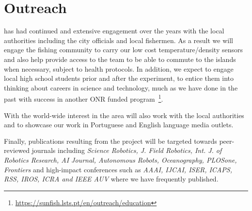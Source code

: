 \section{Outreach}

\univ has had continued and extensive engagement over the years with the
local authorities including the \naz city officials and local fishermen.
As a result we will engage the fishing community to carry our low cost
temperature/density sensors and also help provide access to the team to
be able to commute to the islands when necessary, subject to health
protocols. In addition, we expect to engage local high school students
prior and after the experiment, to entice them into thinking about
careers in science and technology, much as we have done in the past with
success in another ONR funded
program~\footnote{\url{https://sunfish.lsts.pt/en/outreach/education}}.

With the world-wide interest in the area \proj will also work with the
local authorities and \univ to showcase our work in Portuguese and
English language media outlets.

Finally, publications resulting from the project will be targeted
towards peer-reviewed journals including \emph{Science Robotics,
  J. Field Robotics, Int. J. of Robotics Research, AI Journal,
  Autonomous Robots, Oceanography, PLOSone, Frontiers} and high-impact
conferences such as \emph{AAAI, IJCAI, ISER, ICAPS, RSS, IROS, ICRA
  and IEEE AUV} where we have frequently published.

